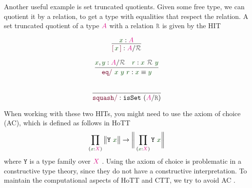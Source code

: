 \documentclass[twoside,11pt,openright]{report}
\theoremstyle{plain} %
\theoremstyle{definition}
\theoremstyle{remark}
\newcommand*{\term}[1]{\textcolor{green!30!black}{#1}} %
\newcommand*{\type}[1]{\textcolor{magenta!90!black}{#1}}
\newcommand*{\relation}[1]{\textcolor{gray!75!black}{\ensuremath{\mathtt{#1}}}}
\newcommand*{\constructor}[1]{\textcolor{purple!60!black}{\ensuremath{\mathtt{#1}}}}
\newcommand*{\typeformer}[1]{\ensuremath{\mathtt{#1}}}
\newcommand*{\quotientconstructor}[1]{\constructor{[}\,#1\,\constructor{]}}
\begin{document}
Another useful example is set truncated quotients. Given some free type, we can quotient it by a relation, to get a type with equalities that respect the relation. A set truncated quotient of a type \(\type{A}\) with a relation \(\relation{R}\) is given by the HIT  \\[-10mm]
\begin{center}
  \strut
  \hfill
  \begin{minipage}{0.2\linewidth}
    \begin{equation}
      \vcenter{\infer{\quotientconstructor{\term{x}} : \type{A} / \relation{\mathcal{R}}}{\term{x} : \type{A}}}
    \end{equation}
  \end{minipage}
  \hfill
  \begin{minipage}{0.325\linewidth}
    \begin{equation}
      \vcenter{\infer{\constructor{eq/}~\term{x}~\term{y}~\term{r} : \term{x} \equiv \term{y}}{\term{x}, \term{y} : \type{A} / \relation{\mathcal{R}} & \term{r} : \term{x}~\relation{\mathcal{R}}~\term{y}}}
    \end{equation}
  \end{minipage}
  \hfill
  \begin{minipage}{0.325\linewidth}
    \begin{equation}
      \vcenter{\infer{\constructor{squash/} :\texttt{isSet}~(\type{A} / \relation{R})}{\strut}}
    \end{equation}
  \end{minipage}
  \hfill
  \strut
\end{center}
When working with these two HITs, you might need to use the axiom of choice (AC), which is defined as follows in HoTT
\begin{equation}
  \prod_{(\term{x} : \type{X})} \big\| \typeformer{Y}~\term{x} \big\| \rightarrow \bigg\| \prod_{(\term{x} : \type{X})} \typeformer{Y}~\term{x} \bigg\|
\end{equation}
where \(\typeformer{Y}\) is a type family over \(\type{X}\) \cite[Section 3.8]{hottbook}. Using the axiom of choice is problematic in a constructive type theory, since they do not have a constructive interpretation. To maintain the computational aspects of HoTT and CTT, we try to avoid AC \cite[Introduction]{hottbook}.
\\ \\
\end{document}
